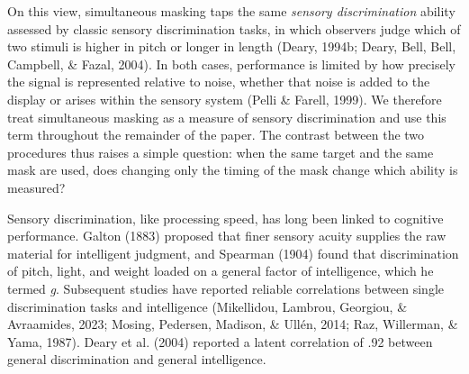 \documentclass[
  ,man]{apa6}
\begin{document}
On this view, simultaneous masking taps the same \emph{sensory discrimination} ability assessed by classic sensory discrimination tasks, in which observers judge which of two stimuli is higher in pitch or longer in length (Deary, 1994b; Deary, Bell, Bell, Campbell, \& Fazal, 2004). In both cases, performance is limited by how precisely the signal is represented relative to noise, whether that noise is added to the display or arises within the sensory system (Pelli \& Farell, 1999). We therefore treat simultaneous masking as a measure of sensory discrimination and use this term throughout the remainder of the paper. The contrast between the two procedures thus raises a simple question: when the same target and the same mask are used, does changing only the timing of the mask change which ability is measured?

Sensory discrimination, like processing speed, has long been linked to cognitive performance. Galton (1883) proposed that finer sensory acuity supplies the raw material for intelligent judgment, and Spearman (1904) found that discrimination of pitch, light, and weight loaded on a general factor of intelligence, which he termed \emph{g}. Subsequent studies have reported reliable correlations between single discrimination tasks and intelligence (Mikellidou, Lambrou, Georgiou, \& Avraamides, 2023; Mosing, Pedersen, Madison, \& Ullén, 2014; Raz, Willerman, \& Yama, 1987). Deary et al. (2004) reported a latent correlation of .92 between general discrimination and general intelligence.
\end{document}

